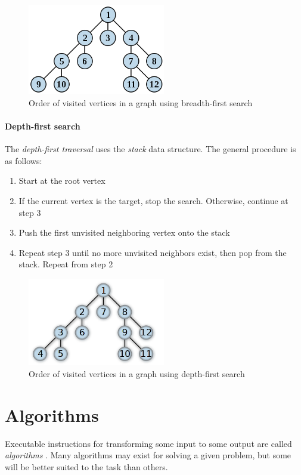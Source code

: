 \documentclass{article}
\begin{document}
{\begin{figure}[H]
  \centering
  \includegraphics[width=6cm]{breadth_first_search}
  \caption{Order of visited vertices in a graph using breadth-first search\cite{bfs}}
\end{figure}

\paragraph{Depth-first search}
The {\em depth-first traversal} uses the {\em stack} data structure. The general procedure is as follows:
\begin{enumerate}
\item{Start at the root vertex}
\item{If the current vertex is the target, stop the search. Otherwise, continue at step 3}
\item{Push the first unvisited neighboring vertex onto the stack}
\item{Repeat step 3 until no more unvisited neighbors exist, then pop from the stack. Repeat from step 2}
\end{enumerate}

\begin{figure}[H]
  \centering
  \includegraphics[width=6cm]{depth_first_search}
  \caption{Order of visited vertices in a graph using depth-first search\cite{dfs}}
\end{figure}




\section{Algorithms}
Executable instructions for transforming some input to some output are called {\em algorithms}
\cite[p.5]{introduction-to-algorithms}. Many algorithms may exist for solving a given problem, but some will be better suited
to the task than others.

}
\end{document}
